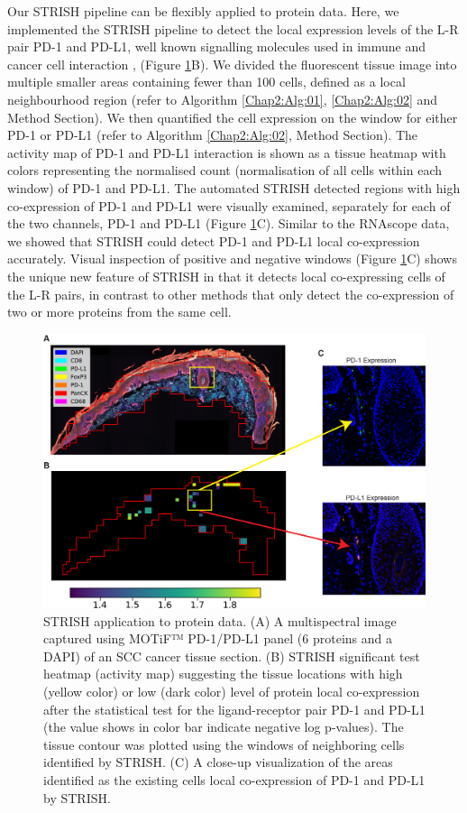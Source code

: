 Our STRISH pipeline can be flexibly applied to protein data. Here, we implemented the STRISH pipeline to detect the local expression levels of the L-R pair PD-1 and PD-L1, well known signalling molecules used in immune and cancer cell interaction \cite{pardoll2012blockade}, (Figure \ref{fig:Chap2_figure3}B). We divided the fluorescent tissue image into multiple smaller areas containing fewer than 100 cells, defined as a local neighbourhood region (refer to Algorithm \ref{Chap2:Alg:01}, \ref{Chap2:Alg:02} and Method Section). We then quantified the cell expression on the window for either PD-1 or PD-L1 (refer to Algorithm \ref{Chap2:Alg:02}, Method Section). The activity map of PD-1 and PD-L1 interaction is shown as a tissue heatmap with colors representing the normalised count (normalisation of all cells within each window) of PD-1 and PD-L1. The automated STRISH detected regions with high co-expression of PD-1 and PD-L1 were visually examined, separately for each of the two channels, PD-1 and PD-L1 (Figure \ref{fig:Chap2_figure3}C). Similar to the RNAscope data, we showed that STRISH could detect PD-1 and PD-L1 local co-expression accurately. Visual inspection of positive and negative windows (Figure \ref{fig:Chap2_figure3}C) shows the unique new feature of STRISH in that it detects local co-expressing cells of the L-R pairs, in contrast to other methods that only detect the co-expression of two or more proteins from the same cell. 
\begin{figure}[htp]
    \centering
    \includegraphics[width=0.8\columnwidth]{Chapter2/Figures/Chapter2_Fig3.jpg}
    \caption{ STRISH application to protein data. (A) A multispectral image captured using MOTiF™ PD-1/PD-L1 panel (6 proteins and a DAPI) of an SCC cancer tissue section. (B) STRISH significant test heatmap (activity map) suggesting the tissue locations with high (yellow color) or low (dark color) level of protein local co-expression after the statistical test for the ligand-receptor pair PD-1 and PD-L1 (the value shows in color bar indicate negative log p-values). The tissue contour was plotted using the windows of neighboring cells identified by STRISH. (C) A close-up visualization of the areas identified as the existing cells local co-expression of PD-1 and PD-L1 by STRISH.}
    \label{fig:Chap2_figure3}
\end{figure}

